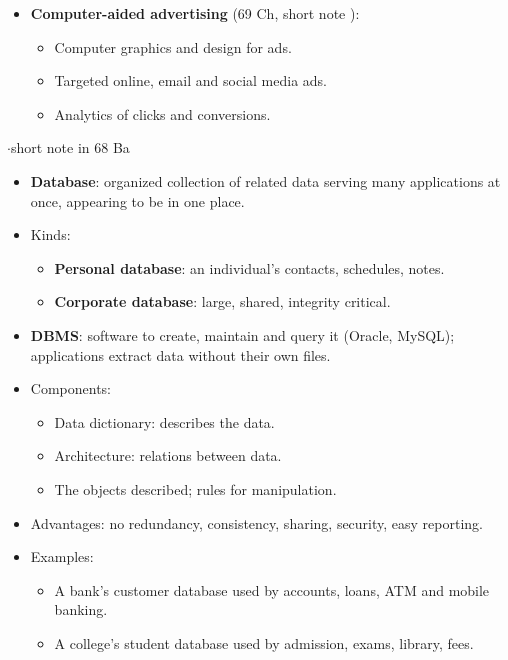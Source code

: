 {\begin{itemize}
\begin{itemize}
    \item Collects orders and feedback (data).
    \item Gives staff remote access to reports.
  \end{itemize}
  \item \textbf{Computer-aided advertising} (69 Ch, short note  ): \added
  \begin{itemize}
    \item Computer graphics and design for ads.
    \item Targeted online, email and social media ads.
    \item Analytics of clicks and conversions.
  \end{itemize}
\end{itemize}}

{\color{sub}\footnotesize {}  \gap$\cdot$\gap short note in 68 Ba}
\begin{itemize}
  \item \textbf{Database}: organized collection of related data serving many applications at
    once, appearing to be in one place.
  \item Kinds:
  \begin{itemize}
    \item \textbf{Personal database}: an individual's contacts, schedules, notes.
    \item \textbf{Corporate database}: large, shared, integrity critical.
  \end{itemize}
  \item \textbf{DBMS}: software to create, maintain and query it (Oracle, MySQL); applications
    extract data without their own files.
  \item Components:
  \begin{itemize}
    \item Data dictionary: describes the data.
    \item Architecture: relations between data.
    \item The objects described; rules for manipulation.
  \end{itemize}
  \item Advantages: no redundancy, consistency, sharing, security, easy reporting.
  \item Examples:
  \begin{itemize}
    \item A bank's customer database used by accounts, loans, ATM and mobile banking.
    \item A college's student database used by admission, exams, library, fees.
  \end{itemize}
\end{itemize}

